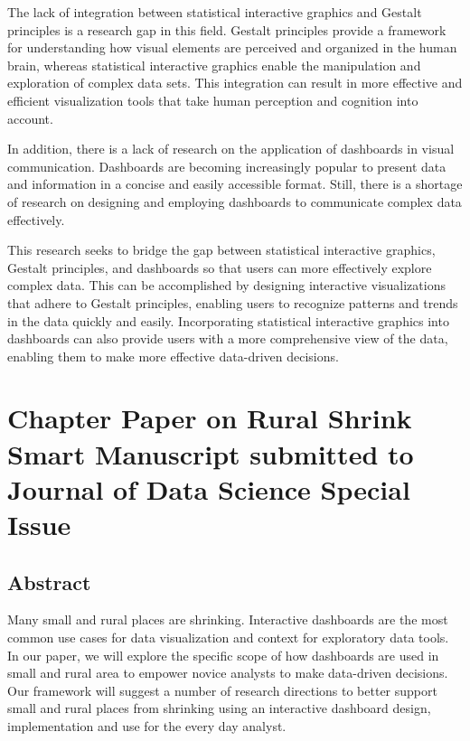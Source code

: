 \documentclass[print]{nuthesis}
\begin{document}
The lack of integration between statistical interactive graphics and Gestalt principles is a research gap in this field.
Gestalt principles provide a framework for understanding how visual elements are perceived and organized in the human brain, whereas statistical interactive graphics enable the manipulation and exploration of complex data sets.
This integration can result in more effective and efficient visualization tools that take human perception and cognition into account.

In addition, there is a lack of research on the application of dashboards in visual communication.
Dashboards are becoming increasingly popular to present data and information in a concise and easily accessible format.
Still, there is a shortage of research on designing and employing dashboards to communicate complex data effectively.

This research seeks to bridge the gap between statistical interactive graphics, Gestalt principles, and dashboards so that users can more effectively explore complex data.
This can be accomplished by designing interactive visualizations that adhere to Gestalt principles, enabling users to recognize patterns and trends in the data quickly and easily.
Incorporating statistical interactive graphics into dashboards can also provide users with a more comprehensive view of the data, enabling them to make more effective data-driven decisions.

\hypertarget{rmd-basics}{%
\chapter{Chapter Paper on Rural Shrink Smart Manuscript submitted to Journal of Data Science Special Issue}\label{rmd-basics}}

\hypertarget{abstract}{%
\section{Abstract}\label{abstract}}

Many small and rural places are shrinking. Interactive dashboards are the most common use cases for data visualization and context for exploratory data tools. In our paper, we will explore the specific scope of how dashboards are used in small and rural area to empower novice analysts to make data-driven decisions. Our framework will suggest a number of research directions to better support small and rural places from shrinking using an interactive dashboard design, implementation and use for the every day analyst.
\end{document}
